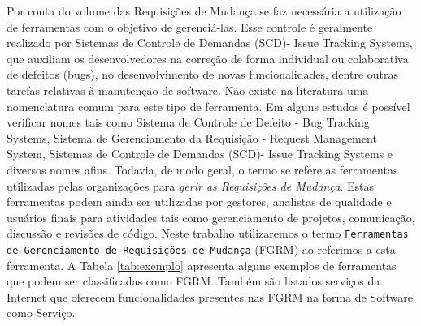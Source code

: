 \documentclass[msc,proposal,hidelot,hideabstract]{ppgccufmg} %
\begin{document}

Por conta do volume das Requisições de Mudança se faz necessária a utilização de ferramentas com o objetivo de gerenciá-las. Esse controle é geralmente realizado por Sistemas de Controle de Demandas (SCD)- Issue Tracking Systems, que auxiliam os desenvolvedores na correção de forma individual ou colaborativa de defeitos (bugs), no desenvolvimento de novas funcionalidades, dentre outras tarefas relativas à manutenção de software. Não existe na literatura uma nomenclatura comum para este tipo de ferramenta. Em alguns estudos é possível verificar nomes tais como Sistema de Controle de Defeito - Bug Tracking Systems, Sistema de Gerenciamento da Requisição - Request Management System, Sistemas de Controle de Demandas (SCD)- Issue Tracking Systems e diversos nomes afins. Todavia, de modo geral, o termo se refere as ferramentas utilizadas pelas organizações para \textit{gerir as Requisições de Mudança}. Estas ferramentas podem ainda ser utilizadas por gestores, analistas de qualidade e usuários finais para atividades tais como gerenciamento de projetos, comunicação, discussão e revisões de código. Neste trabalho utilizaremos o termo \texttt{Ferramentas de Gerenciamento de Requisições de Mudança} (FGRM) ao referimos a esta ferramenta. A Tabela \ref{tab:exemplo} apresenta alguns exemplos de ferramentas que podem ser classificadas como FGRM. Também são listados serviços da Internet que oferecem funcionalidades presentes nas FGRM na forma de Software como Serviço.

\begin{table}[ht]
	\centering
	\caption{Exemplos de ferramentas e serviços da Internet. Adaptado de \cite{cavalcanti2014challenges}}
	\label{tab:exemplo}
\end{table}
\end{document}
